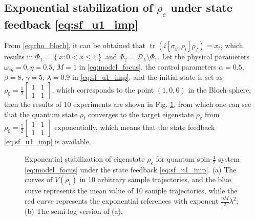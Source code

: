 \documentclass[]{elsarticle}
\begin{document}
\subsection{Exponential stabilization of $\rho_e$ under state feedback \eqref{eq:sf_u1_imp}}\label{subsec:cfm}
From \eqref{eq:rho_bloch}, it can be obtained that $\operatorname{tr}\left(i\left[\sigma_{y}, \rho_{t}\right] {\rho_f}\right)=x_{t}$, which results in $\Phi_1=\left\{x:0<x\le1\right\}$ and $\Phi_2=\mathcal{D}_\lambda\setminus\Phi_1$. Let the physical parameters $\omega_{eg}=0, \eta=0.5$, $M=1$ in \eqref{eq:model_focus}, the control parameters $\alpha=0.5$, $\beta=8$, $\gamma=5$, $\lambda=0.9$ in \eqref{eq:sf_u1_imp}, and the initial state is set as $\rho_0=\frac{1}{2}\left[\begin{array}{cc}
	1 & 1 \\
	1 & 1
\end{array}\right]$, which corresponds to the point $\left(1, 0, 0\right)$ in the Bloch sphere, then the results of 10 experiments are shown in Fig. \ref{figur:numerical_results_1}, from which one can see that the quantum state $\rho_{t}$ converges to the target eigenstate $\rho_{e}$ from $\rho_0=\frac{1}{2}\left[\begin{array}{cc}
	1 & 1 \\
	1 & 1
\end{array}\right]$ exponentially, which means that the state feedback \eqref{eq:sf_u1_imp} is available. {}
\begin{figure}[!htbp]
	\centering
	\hfil
	\caption{Exponential stabilization of eigenstate $\rho_{e}$ for quantum spin-$\frac{1}{2}$ system \eqref{eq:model_focus} under the state feedback \eqref{eq:sf_u1_imp}. (a) The curves of $V\left(\rho_{t}\right)$ in 10 arbitrary sample trajectories, and the blue curve represents the mean value of 10 sample trajectories, while the red curve represents the exponential references with exponent $\frac{{\eta M}}{2}\lambda^{2}$; (b)  The semi-log version of (a).}
	\label{figur:numerical_results_1}
\end{figure}
\end{document}
